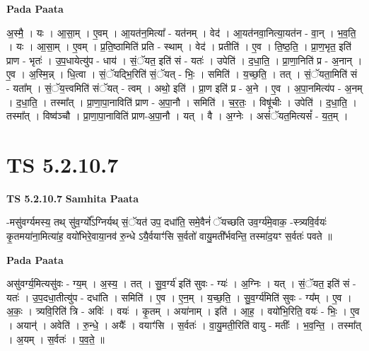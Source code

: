 \documentclass[17pt]{extarticle}
\begin{document}
\textbf{Pada Paata} \newline

अ॒स्मै॒ । यः । आ॒सा॒म् । ए॒वम् । आ॒यत॑न॒मित्या᳚ - यत॑नम् । वेद॑ । आ॒यत॑नवा॒नित्या॒यत॑न - वा॒न् । भ॒व॒ति॒ । यः । आ॒सा॒म् । ए॒वम् । प्र॒ति॒ष्ठामिति॑ प्रति - स्थाम् । वेद॑ । प्रतीति॑ । ए॒व । ति॒ष्ठ॒ति॒ । प्रा॒ण॒भृत॒ इति॑ प्राण - भृतः॑ । उ॒प॒धायेत्यु॑प - धाय॑ । सं॒ॅयत॒ इति॑ सं - यतः॑ । उपेति॑ । द॒धा॒ति॒ । प्रा॒णा॒निति॑ प्र - अ॒नान् । ए॒व । अ॒स्मि॒न्न् । धि॒त्वा । सं॒ॅयद्भि॒रिति॑ सं॒ॅयत् - भिः॒ । समिति॑ । य॒च्छ॒ति॒ । तत् । सं॒ॅयता॒मिति॑ सं - यता᳚म् । सं॒ॅय॒त्त्वमिति॑ संॅयत् - त्वम् । अथो॒ इति॑ । प्रा॒ण इति॑ प्र - अ॒ने । ए॒व । अ॒पा॒नमित्य॑प - अ॒नम् । द॒धा॒ति॒ । तस्मा᳚त् । प्रा॒णा॒पा॒नाविति॑ प्राण - अ॒पा॒नौ । समिति॑ । च॒र॒तः॒ । विषू॑चीः । उपेति॑ । द॒धा॒ति॒ । तस्मा᳚त् । विष्व॑ञ्चौ । प्रा॒णा॒पा॒नाविति॑ प्राण-अ॒पा॒नौ । यत् । वै । अ॒ग्नेः । असं॑ॅयत॒मित्यसं᳚ - य॒त॒म् ।  \newline





\section{ TS 5.2.10.7 }

\textbf{TS 5.2.10.7 } \newline
\textbf{Samhita Paata} \newline

-मसु॑वर्ग्यमस्य॒ तथ् सु॑व॒र्ग्यो᳚ऽग्निर्यथ् सं॒ॅयत॑ उप॒ दधा॑ति॒ समे॒वैनं॑ ॅयच्छति उव॒र्ग्य॑मे॒वाक॒ -स्त्र्यवि॒र्वयः॑ कृ॒तमया॑ना॒मित्या॑ह॒ वयो॑भिरे॒वाया॒नव॑ रु॒न्धे ऽयै॒र्वयाꣳ॑सि स॒र्वतो॑ वायु॒मती᳚र्भवन्ति॒ तस्मा॑द॒यꣳ स॒र्वतः॑ पवते ॥ \newline

\textbf{Pada Paata} \newline

असु॑वर्ग्य॒मित्यसु॑वः - ग्य॒म् । अ॒स्य॒ । तत् । सु॒व॒र्ग्य॑ इति॑ सुवः - ग्यः॑ । अ॒ग्निः । यत् । सं॒ॅयत॒ इति॑ सं - यतः॑ । उ॒प॒दधा॒तीत्यु॑प - दधा॑ति । समिति॑ । ए॒व । ए॒न॒म् । य॒च्छ॒ति॒ । सु॒व॒र्ग्य॑मिति॑ सुवः - ग्य᳚म् । ए॒व । अ॒कः॒ । त्र्यवि॒रिति॑ त्रि - अविः॑ । वयः॑ । कृ॒तम् । अया॑नाम् । इति॑ । आ॒ह॒ । वयो॑भि॒रिति॒ वयः॑ - भिः॒ । ए॒व । अयान्॑ । अवेति॑ । रु॒न्धे॒ । अयैः᳚ । वयाꣳ॑सि । स॒र्वतः॑ । वा॒यु॒मती॒रिति॑ वायु - मतीः᳚ । भ॒व॒न्ति॒ । तस्मा᳚त् । अ॒यम् । स॒र्वतः॑ । प॒व॒ते॒ ॥  \newline




\end{document}
